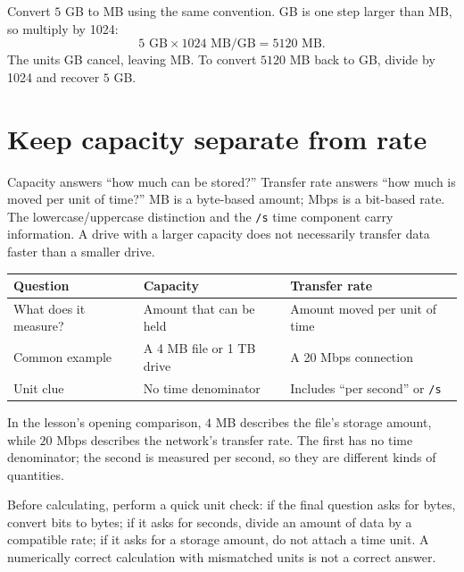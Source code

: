 \begin{example}
Convert $5$ GB to MB using the same convention. GB is one step larger than
MB, so multiply by 1024:
\[
  5\text{ GB}\times 1024\text{ MB/GB}=5120\text{ MB}.
\]
The units GB cancel, leaving MB. To convert $5120$ MB back to GB, divide by
1024 and recover $5$ GB.
\end{example}

\section{Keep capacity separate from rate}
Capacity answers ``how much can be stored?'' Transfer rate answers ``how
much is moved per unit of time?'' MB is a byte-based amount; Mbps is a
bit-based rate. The lowercase/uppercase distinction and the \texttt{/s}
time component carry information. A drive with a larger capacity does not
necessarily transfer data faster than a smaller drive.

\begin{center}
\begin{tabular}{p{}p{}p{}}
\toprule
\textbf{Question} & \textbf{Capacity} & \textbf{Transfer rate}\\
\midrule
What does it measure? & Amount that can be held & Amount moved per unit of time\\
Common example & A 4 MB file or 1 TB drive & A 20 Mbps connection\\
Unit clue & No time denominator & Includes ``per second'' or \texttt{/s}\\
\bottomrule
\end{tabular}
\end{center}

\begin{example}
In the lesson's opening comparison, $4$ MB describes the file's storage
amount, while $20$ Mbps describes the network's transfer rate. The first
has no time denominator; the second is measured per second, so they are
different kinds of quantities.
\end{example}

Before calculating, perform a quick unit check: if the final question asks
for bytes, convert bits to bytes; if it asks for seconds, divide an amount
of data by a compatible rate; if it asks for a storage amount, do not attach
a time unit. A numerically correct calculation with mismatched units is not
a correct answer.


